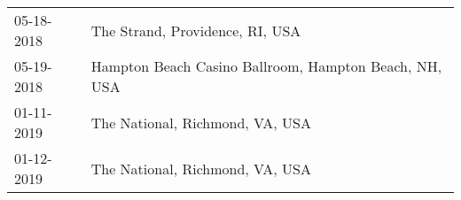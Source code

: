 \begin{supertabular}{ll}
 05-18-2018 &                        The Strand, Providence, RI, USA \\
 05-19-2018 &  Hampton Beach Casino Ballroom, Hampton Beach, NH, USA \\
 01-11-2019 &                        The National, Richmond, VA, USA \\
 01-12-2019 &                        The National, Richmond, VA, USA \\
\end{supertabular}

